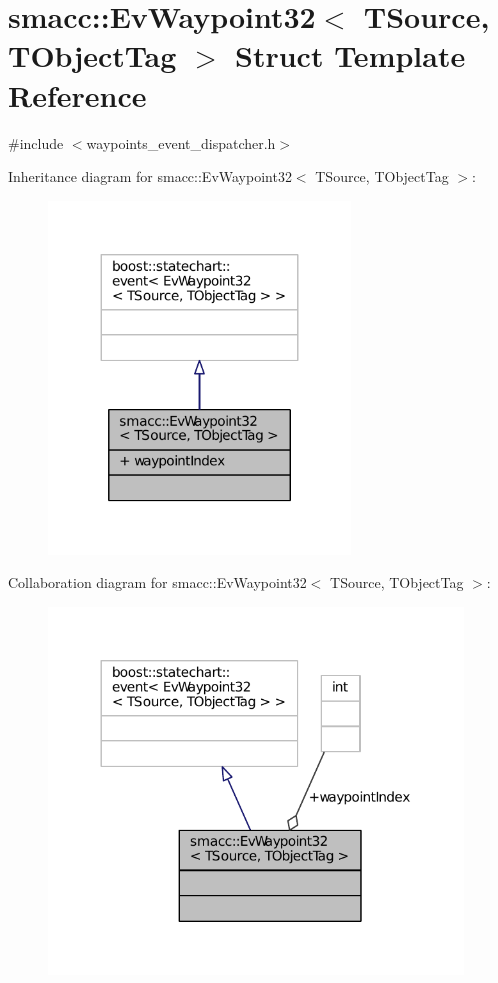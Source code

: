 \hypertarget{structsmacc_1_1EvWaypoint32}{}\section{smacc\+:\+:Ev\+Waypoint32$<$ T\+Source, T\+Object\+Tag $>$ Struct Template Reference}
\label{structsmacc_1_1EvWaypoint32}


{\ttfamily \#include $<$waypoints\+\_\+event\+\_\+dispatcher.\+h$>$}



Inheritance diagram for smacc\+:\+:Ev\+Waypoint32$<$ T\+Source, T\+Object\+Tag $>$\+:
\nopagebreak
\begin{figure}[H]
\begin{center}
\leavevmode
\includegraphics[width=227pt]{structsmacc_1_1EvWaypoint32__inherit__graph}
\end{center}
\end{figure}


Collaboration diagram for smacc\+:\+:Ev\+Waypoint32$<$ T\+Source, T\+Object\+Tag $>$\+:
\nopagebreak
\begin{figure}[H]
\begin{center}
\leavevmode
\includegraphics[width=312pt]{structsmacc_1_1EvWaypoint32__coll__graph}
\end{center}
\end{figure}
